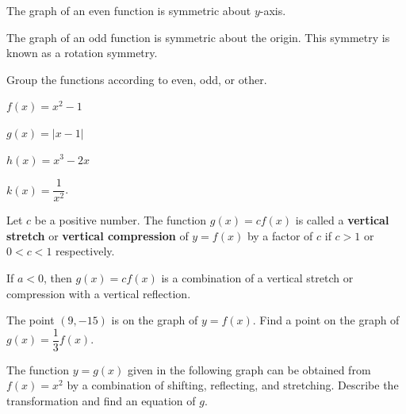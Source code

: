 \begin{remark}
  The graph of an even function is symmetric about $y$-axis.

  The graph of an odd function is symmetric about the origin. This symmetry is known as a rotation symmetry.
\end{remark}

\begin{example}
  Group the functions according to even, odd, or other.\\
  \begin{enumerate*}
    \item $f(x)=x^2-1$
    \item $g(x)=|x-1|$
    \item $h(x)=x^3-2x$
    \item $k(x)=\dfrac{1}{x^2}$.
  \end{enumerate*}
\end{example}

\begin{definition}
  Let $c$ be a positive number.
  The function $g(x)=cf(x)$ is called a \textbf{vertical stretch} or \textbf{vertical compression} of $y=f(x)$ by a factor of $c$ if $c>1$ or $0<c<1$ respectively.
\end{definition}
\begin{remark}
  If $a<0$, then $g(x)=cf(x)$ is a combination of a vertical stretch or compression with a vertical reflection.
\end{remark}

\begin{example}
  The point $(9, -15)$ is on the graph of $y=f(x)$. Find a point on the graph of $g(x)=\dfrac{1}{3}f(x)$.
\end{example}
\vspace*{-0.3\textheight}

\newpage
\begin{example}
  The function $y=g(x)$ given in the following graph can be obtained from $f(x)=x^2$ by a combination of shifting, reflecting, and stretching. Describe the transformation and find an equation of $g$.\\

\end{example}
\vspace*{-0.1\textheight}


